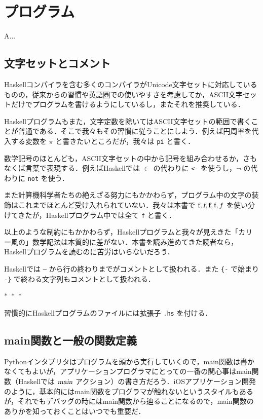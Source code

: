 \documentclass[a4paper,twocolumn]{jsbook}
\newcommand{\separator}{\begin{center}$*$~$*$~$*$\end{center}}
\newcommand{\programminglanguage}[1]{\textsf{#1}}
\newcommand{\haskell}{\programminglanguage{Haskell}}
\newcommand{\python}{\programminglanguage{Python}}
\newenvironment{leader}{\begingroup\gt}{\endgroup}
\newcommand{\code}[1]{\texttt{#1}}
\newcommand{\filename}[1]{\texttt{#1}}
\newcommand{\mAction}[1]{\textsl{#1}}
\DeclareMathOperator{\mMain}{\mAction{main}}
\DeclareMathOperator{\mFrom}{\in}
\begin{document}
\chapter{プログラム}

\begin{leader}
A...
\end{leader}


\section{文字セットとコメント}

\haskell コンパイラを含む多くのコンパイラがUnicode文字セットに対応しているものの，従来からの習慣や英語圏での使いやすさを考慮してか，ASCII文字セットだけでプログラムを書けるようにしているし，またそれを推奨している．

\haskell プログラムもまた，文字定数を除いてはASCII文字セットの範囲で書くことが普通である．そこで我々もその習慣に従うことにしよう．例えば円周率を代入する変数を $\pi$ と書きたいところだが，我々は \code{pi} と書く．

数学記号のほとんども，ASCII文字セットの中から記号を組み合わせるか，さもなくば言葉で表現する．例えば\haskell では $\mFrom$ の代わりに \code{<-} を使うし，$\neg$ の代わりに \code{not} を使う．

また計算機科学者たちの絶えざる努力にもかかわらず，プログラム中の文字の装飾はこれまでほとんど受け入れられていない．我々は本書で $\textrm{f},\textsl{f},\textbf{f},\textsf{f},f$ を使い分けてきたが，\haskell プログラム中では全て \code{f} と書く．

以上のような制約にもかかわらず，\haskell プログラムと我々が見えきた「カリー風の」数学記法は本質的に差がない．本書を読み進めてきた読者なら，\haskell プログラムを読むのに苦労はいらないだろう．

\haskell では \code{--} から行の終わりまでがコメントとして扱われる．また \code{\{-} で始まり \code{-\}} で終わる文字列もコメントとして扱われる．

\separator

習慣的に\haskell プログラムのファイルには拡張子 \filename{.hs} を付ける．

\section{main関数と一般の関数定義}

\python インタプリタはプログラムを頭から実行していくので，main関数は書かなくてもよいが，アプリケーションプログラマにとっての一番の関心事はmain関数（\haskell では $\mMain$ アクション）の書き方だろう．iOSアプリケーション開発のように，基本的にはmain関数をプログラマが触れないというスタイルもあるが，それでもデバッグの時にはmain関数から辿ることになるので，main関数のありかを知っておくことはいつでも重要だ．
\end{document}
